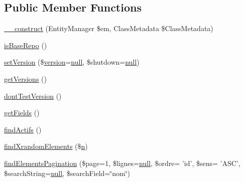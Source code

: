 \subsection*{Public Member Functions}
\begin{DoxyCompactItemize}
\item 
\hyperlink{class_acme_group_1_1_labo_bundle_1_1_entity_1_1base_repository_aad21c1c1fada0b28ac35e20c6354fcc0}{\+\_\+\+\_\+construct} (Entity\+Manager \$em, Class\+Metadata \$Class\+Metadata)
\item 
\hyperlink{class_acme_group_1_1_labo_bundle_1_1_entity_1_1base_repository_aa98dc8602d3d94e256a311e275fda027}{is\+Base\+Repo} ()
\item 
\hyperlink{class_acme_group_1_1_labo_bundle_1_1_entity_1_1base_repository_a471e6e327a351c684c8a5bfbbacfcaa8}{set\+Version} (\$\hyperlink{class_acme_group_1_1_labo_bundle_1_1_entity_1_1version}{version}=\hyperlink{validate_8js_afb8e110345c45e74478894341ab6b28e}{null}, \$shutdown=\hyperlink{validate_8js_afb8e110345c45e74478894341ab6b28e}{null})
\item 
\hyperlink{class_acme_group_1_1_labo_bundle_1_1_entity_1_1base_repository_aa92e5c01fe27bec5dbb4234f0bb6ed27}{get\+Versions} ()
\item 
\hyperlink{class_acme_group_1_1_labo_bundle_1_1_entity_1_1base_repository_aab4c836fd1e548cffb186dc12c0f6345}{dont\+Test\+Version} ()
\item 
\hyperlink{class_acme_group_1_1_labo_bundle_1_1_entity_1_1base_repository_a2e67063177c80a9b861b12922f5f8665}{get\+Fields} ()
\item 
\hyperlink{class_acme_group_1_1_labo_bundle_1_1_entity_1_1base_repository_a3dd3f828f91ea46e7432d0f91009e5aa}{find\+Actifs} ()
\item 
\hyperlink{class_acme_group_1_1_labo_bundle_1_1_entity_1_1base_repository_a5fbbba858fa47f11db92bd2d3bde6e2f}{find\+Xrandom\+Elements} (\$\hyperlink{fullpage_2plugin_8min_8js_ab767a859d1217315f42c9bb52fc648dc}{n})
\item 
\hyperlink{class_acme_group_1_1_labo_bundle_1_1_entity_1_1base_repository_a479cfd243037c1d422e52a51ed703e78}{find\+Elements\+Pagination} (\$page=1, \$lignes=\hyperlink{validate_8js_afb8e110345c45e74478894341ab6b28e}{null}, \$ordre= 'id', \$sens= 'A\+S\+C', \$search\+String=\hyperlink{validate_8js_afb8e110345c45e74478894341ab6b28e}{null}, \$search\+Field=\char`\"{}nom\char`\"{})
\end{DoxyCompactItemize}
